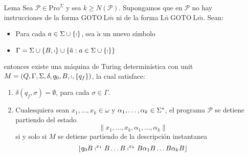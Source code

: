 \begin{frame}
  \begin{alertblock}{Lema}
    \PN Sea $\mathcal{P} \in \mathrm{Pro}^{\Sigma}$ y sea $k \geq N(\mathcal{P})$. Supongamos que en $\mathcal{P}$ no
    hay instrucciones de la forma $\mathrm{GOTO} \ \mathrm{L}\bar{m}$ ni de la forma $\mathrm{L}\bar{n} \ \mathrm{GOTO}
    \ \mathrm{L}\bar{m}$. Sean:
    \begin{itemize}
      \item Para cada $a \in \Sigma \cup \{\shortmid\}$, sea $\tilde{a}$ un nuevo símbolo
      \item $\Gamma = \Sigma \cup \{B, \shortmid\} \cup \{\tilde{a}: a \in \Sigma \cup \{\shortmid\}\}$
    \end{itemize}
    \PN entonces existe una máquina de Turing determinística con unit $M = \left(Q, \Gamma, \Sigma, \delta, q_{0}, B,
    \shortmid,\{q_{f}\}\right)$, la cual satisface:
    \begin{enumerate}[1)]
      \item $\delta (q_{f},\sigma) = \emptyset$, para cada $\sigma \in \Gamma$.

      \item Cualesquiera sean $x_{1}, \dotsc, x_{k} \in \omega$ y $\alpha_{1}, \dotsc, \alpha_{k} \in \Sigma^{\ast}$, el
      programa $\mathcal{P}$ se detiene partiendo del estado
      \begin{equation*}
        \lVert x_{1}, \dotsc, x_{k}, \alpha_{1}, \dotsc, \alpha_{k} \rVert
      \end{equation*}
      \PN si y solo si $M$ se detiene partiendo de la descripción instantanea
      \begin{equation*}
        \left\lfloor q_{0} B \shortmid^{x_{1}} B \dotsc B \shortmid^{x_{k}} B \alpha_{1} B \dotsc B \alpha_{k} B
        \right\rfloor
      \end{equation*}
    \end{enumerate}
  \end{alertblock}
\end{frame}
